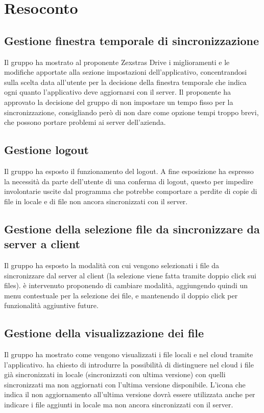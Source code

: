 \section{Resoconto}
\subsection{Gestione finestra temporale di sincronizzazione}
Il gruppo ha mostrato al proponente Zexstras Drive i miglioramenti e le modifiche apportate alla sezione impostazioni dell'applicativo, concentrandosi sulla scelta data all'utente per la decisione della finestra temporale che indica ogni quanto l'applicativo deve aggiornarsi con il server. Il proponente ha approvato la decisione del gruppo di non impostare un tempo fisso per la sincronizzazione, consigliando però di non dare come opzione tempi troppo brevi, che possono portare problemi ai server dell'azienda.

\subsection{Gestione logout}
Il gruppo ha esposto il funzionamento del logout. A fine esposizione \textit{\Alessio{}} ha espresso la necessità da parte dell'utente di una conferma di logout, questo per impedire involontarie uscite dal programma che potrebbe comportare a perdite di copie di file in locale e di file non ancora sincronizzati con il server.

\subsection{Gestione della selezione file da sincronizzare da server a client}
Il gruppo ha esposto la modalità con cui vengono selezionati i file da sincronizzare dal server al client (la selezione viene fatta tramite doppio click sui files). \textit{\Alessio{}} è intervenuto proponendo di cambiare modalità, aggiungendo quindi un menu contestuale per la selezione dei file, e mantenendo il doppio click per funzionalità aggiuntive future. 

\subsection{Gestione della visualizzazione dei file}
Il gruppo ha mostrato come vengono visualizzati i file locali e nel cloud tramite l'applicativo. \textit{\Alessio{}} ha chiesto di introdurre la possibilità di distinguere nel cloud i file già sincronizzati in locale (sincronizzati con ultima versione) con quelli sincronizzati ma non aggiornati con l'ultima versione disponibile. L'icona che indica il non aggiornamento all'ultima versione dovrà essere utilizzata anche per indicare i file aggiunti in locale ma non ancora sincronizzati con il server. 

